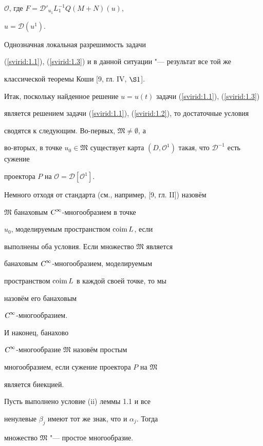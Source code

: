 $\mathcal{O}$, где $F=\mathcal{D}'_{u_1}L_1^{-1}Q(M+N)(u)$,

$u=\mathcal{D}(u^1)$.

Однозначная локальная разрешимость задачи

(\ref{svirid:1.1}), (\ref{svirid:1.3}) и в данной ситуации "--- ре\-зуль\-тат все той же

классической теоремы Коши [9, гл. IV, $\S 1$].



Итак, поскольку найденное решение $u=u(t)$ задачи (\ref{svirid:1.1}), (\ref{svirid:1.3})

яв\-ля\-ет\-ся решением задачи (\ref{svirid:1.1}), (\ref{svirid:1.2}), то достаточные условия

сводятся к следующим. Во-первых, $\mathfrak{M}\neq\emptyset$, а

во-вторых, в точке $u_0\in\mathfrak{M}$ существует карта $(D,

\mathcal{O}^1)$ такая, что $\mathcal{D}^{-1}$ есть сужение

проектора $P$ на $\mathcal{O}=\mathcal{D}[\mathcal{O}^1]$.



Немного отходя от стандарта (см., например, [9, гл. II]) назовём

$\mathfrak{M}$ банаховым $\textsl{C}^\infty$-многообразием в точке

$u_0$, моделируемым пространством ${\rm coim \, } L$, если

вы\-пол\-не\-ны оба условия. Если множество $\mathfrak{M}$ является

ба\-на\-хо\-вым $\textsl{C}^\infty$-многообразием, моделируемым

пространством ${\rm coim \, } L$ в каждой своей точке, то мы

назовём его  банаховым

$\textsl{C}^\infty$-мно\-го\-об\-ра\-зи\-ем.

И наконец, банахово

$\textsl{C}^\infty$-многообразие $\mathfrak{M}$ назовём простым

многообразием, если су\-же\-ние проектора $P$ на $\mathfrak{M}$

является биекцией.

\begin{lemma}[1.3]

Пусть выполнено условие {\rm (ii)} леммы {\rm 1.1} и все

ненулевые $\beta_j$ имеют тот же знак{\rm,} что и $\alpha_j.$ Тогда

множество $\mathfrak{M}$ "--- простое многообразие.

\end{lemma}



